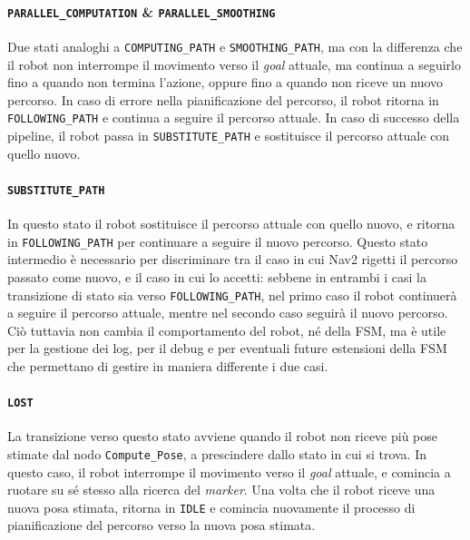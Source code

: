 \documentclass[12pt]{article}
\begin{document}
\paragraph{\texttt{PARALLEL\_COMPUTATION} \& \texttt{PARALLEL\_SMOOTHING}} Due stati analoghi a \texttt{COMPUTING\_PATH} e \texttt{SMOOTHING\_PATH}, ma con la differenza che il robot non interrompe il movimento verso il \textit{goal} attuale, ma continua a seguirlo fino a quando non termina l'azione, oppure fino a quando non riceve un nuovo percorso. In caso di errore nella pianificazione del percorso, il robot ritorna in \texttt{FOLLOWING\_PATH} e continua a seguire il percorso attuale. In caso di successo della pipeline, il robot passa in \texttt{SUBSTITUTE\_PATH} e sostituisce il percorso attuale con quello nuovo.
\paragraph{\texttt{SUBSTITUTE\_PATH}} In questo stato il robot sostituisce il percorso attuale con quello nuovo, e ritorna in \texttt{FOLLOWING\_PATH} per continuare a seguire il nuovo percorso. Questo stato intermedio è necessario per discriminare tra il caso in cui Nav2 rigetti il percorso passato come nuovo, e il caso in cui lo accetti: sebbene in entrambi i casi la transizione di stato sia verso \texttt{FOLLOWING\_PATH}, nel primo caso il robot continuerà a seguire il percorso attuale, mentre nel secondo caso seguirà il nuovo percorso. Ciò tuttavia non cambia il comportamento del robot, né della FSM, ma è utile per la gestione dei log, per il debug e per eventuali future estensioni della FSM che permettano di gestire in maniera differente i due casi.
\paragraph{\texttt{LOST}} La transizione verso questo stato avviene quando il robot non riceve più pose stimate dal nodo \texttt{Compute\_Pose}, a prescindere dallo stato in cui si trova. In questo caso, il robot interrompe il movimento verso il \textit{goal} attuale, e comincia a ruotare su sé stesso alla ricerca del \textit{marker}. Una volta che il robot riceve una nuova posa stimata, ritorna in \texttt{IDLE} e comincia nuovamente il processo di pianificazione del percorso verso la nuova posa stimata.
\end{document}
